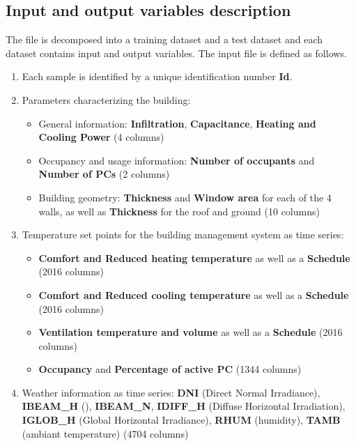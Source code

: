 \documentclass[nolayout]{article}
\begin{document}
\subsection*{Input and output variables description}
The file is decomposed into a training dataset  and a test dataset and each dataset contains input and output variables.
 The input file is defined as follows. 
\begin{enumerate}[-]
    \item Each sample is identified by a unique identification number {\bf Id}.
    \item Parameters characterizing the building:
    \begin{itemize}
        \item General information: {\bf Infiltration}, {\bf Capacitance}, {\bf Heating and Cooling Power} (4 columns)
        \item Occupancy and usage information: {\bf Number of occupants} and {\bf Number of PCs} (2 columns)
        \item Building geometry: {\bf Thickness} and {\bf Window area} for each of the 4 walls, as well as {\bf Thickness} for the roof and ground (10 columns)
    \end{itemize}
    
    \item Temperature set points for the building management system as time series:
    \begin{itemize}
        \item {\bf Comfort and Reduced heating temperature} as well as a {\bf Schedule} (2016 columns)
        \item {\bf Comfort and Reduced cooling temperature} as well as a {\bf Schedule} (2016 columns)
        \item {\bf Ventilation temperature and volume} as well as a {\bf Schedule} (2016 columns)
        \item {\bf Occupancy} and {\bf Percentage of active PC} (1344 columns)
    \end{itemize}{}
    
    \item Weather information as time series: {\bf DNI} (Direct Normal Irradiance), {\bf IBEAM\_H} (), {\bf IBEAM\_N}, {\bf IDIFF\_H} (Diffuse Horizontal Irradiation), {\bf IGLOB\_H} (Global Horizontal Irradiance), {\bf RHUM} (humidity), {\bf TAMB} (ambiant temperature) (4704 columns)
    \end{enumerate}
    
\end{document}
